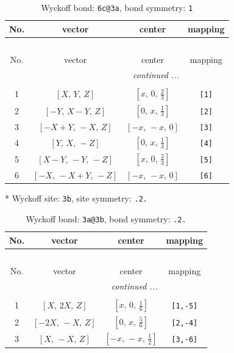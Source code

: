 \documentclass[fleqn,8pt]{jsarticle}
\begin{document}
\renewcommand{\arraystretch}{1.2}
\begin{longtable}{cccc}
\caption{Wyckoff bond: {\tt 6c@3a}, bond symmetry: {\tt 1}}
 \\
 \hline \hline
No. & vector & center & mapping \\ \hline \endfirsthead

\multicolumn{3}{l}{\tablename\ \thetable{}} \\
 \hline \hline
No. & vector & center & mapping \\ \hline \endhead

 \hline \hline
\multicolumn{3}{r}{\footnotesize\it continued ...} \\ \endfoot

 \hline \hline
\multicolumn{3}{r}{} \\ \endlastfoot

1 & $\left[ X,\, Y,\, Z \right]$ & $\left[ x,\, 0,\, \frac{2}{3} \right]$ & {\tt [1]} \\ \hline
2 & $\left[ - Y,\, X - Y,\, Z \right]$ & $\left[ 0,\, x,\, \frac{1}{3} \right]$ & {\tt [2]} \\ \hline
3 & $\left[ - X + Y,\, - X,\, Z \right]$ & $\left[ - x,\, - x,\, 0 \right]$ & {\tt [3]} \\ \hline
4 & $\left[ Y,\, X,\, - Z \right]$ & $\left[ 0,\, x,\, \frac{1}{3} \right]$ & {\tt [4]} \\ \hline
5 & $\left[ X - Y,\, - Y,\, - Z \right]$ & $\left[ x,\, 0,\, \frac{2}{3} \right]$ & {\tt [5]} \\ \hline
6 & $\left[ - X,\, - X + Y,\, - Z \right]$ & $\left[ - x,\, - x,\, 0 \right]$ & {\tt [6]} \\
\end{longtable}
* Wyckoff site: {\tt 3b}, site symmetry: {\tt .2.}
\renewcommand{\arraystretch}{1.2}
\begin{longtable}{cccc}
\caption{Wyckoff bond: {\tt 3a@3b}, bond symmetry: {\tt .2.}}
 \\
 \hline \hline
No. & vector & center & mapping \\ \hline \endfirsthead

\multicolumn{3}{l}{\tablename\ \thetable{}} \\
 \hline \hline
No. & vector & center & mapping \\ \hline \endhead

 \hline \hline
\multicolumn{3}{r}{\footnotesize\it continued ...} \\ \endfoot

 \hline \hline
\multicolumn{3}{r}{} \\ \endlastfoot

1 & $\left[ X,\, 2 X,\, Z \right]$ & $\left[ x,\, 0,\, \frac{1}{6} \right]$ & {\tt [1,-5]} \\ \hline
2 & $\left[ - 2 X,\, - X,\, Z \right]$ & $\left[ 0,\, x,\, \frac{5}{6} \right]$ & {\tt [2,-4]} \\ \hline
3 & $\left[ X,\, - X,\, Z \right]$ & $\left[ - x,\, - x,\, \frac{1}{2} \right]$ & {\tt [3,-6]} \\
\end{longtable}
\end{document}
